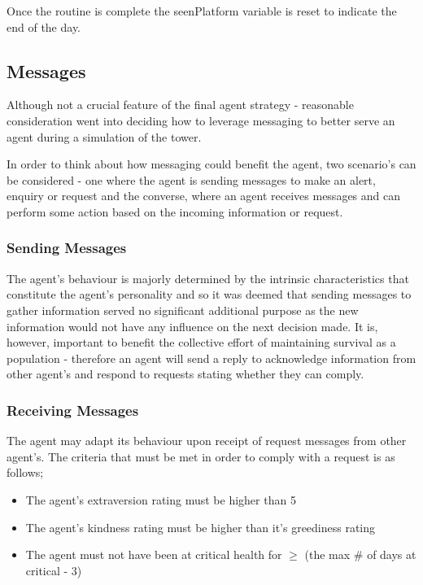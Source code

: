 Once the routine is complete the seenPlatform variable is reset to indicate the end of the day.

\subsection{Messages}
\label{subsec: Messages}
Although not a crucial feature of the final agent strategy - reasonable consideration went into deciding how to leverage messaging to better serve an agent during a simulation of the tower.

In order to think about how messaging could benefit the agent, two scenario's can be considered - one where the agent is sending messages to make an alert, enquiry or request and the converse, where an agent receives messages and can perform some action based on the incoming information or request.
\subsubsection{Sending Messages}
\label{subsubsec: Sending Messages}
The agent's behaviour is majorly determined by the intrinsic characteristics that constitute the agent's personality and so it was deemed that sending messages to gather information served no significant additional purpose as the new information would not have any influence on the next decision made. It is, however, important to benefit the collective effort of maintaining survival as a population - therefore an agent will send a reply to acknowledge information from other agent's and respond to requests stating whether they can comply.

\subsubsection{Receiving Messages}
\label{subsubsec: Receiving Messages}
The agent may adapt its behaviour upon receipt of request messages from other agent's. The criteria that must be met in order to comply with a request is as follows; 

\begin{itemize}
  \item The agent's extraversion rating must be higher than 5
  \item The agent's kindness rating must be higher than it's greediness rating
  \item The agent must not have been at critical health for \(\ge\) (the max \# of days at critical - 3)
\end{itemize}

